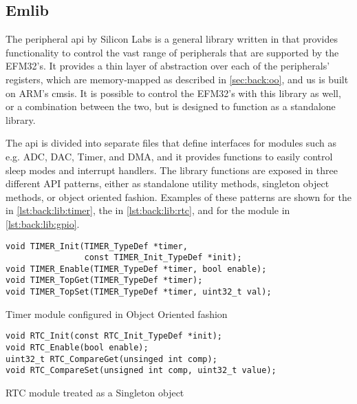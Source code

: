 \subsection{Emlib}
\label{sub:emlib}

The \emlib peripheral \gls{api} by Silicon Labs is a general library written in {\C} that provides functionality to control the vast range of peripherals that are supported by the EFM32's.
It provides a thin layer of abstraction over each of the peripherals' registers, which are memory-mapped as described in \autoref{sec:back:oo}, and us is built on ARM's \gls{cmsis}.
It is possible to control the EFM32's with this library as well, or a combination between the two, but {\emlib} is designed to function as a standalone library.

The \gls{api} is divided into separate files that define interfaces for modules such as e.g. ADC, DAC, Timer, and DMA, and it provides functions to easily control sleep modes and interrupt handlers.
The library functions are exposed in three different API patterns, either as standalone utility methods, singleton object methods, or {\C} object oriented fashion.
Examples of these patterns are shown for the  in \autoref{lst:back:lib:timer}, the  in \autoref{lst:back:lib:rtc}, and for the  module in \autoref{lst:back:lib:gpio}.

\begin{listing}[H]
  \begin{verbatim}
void TIMER_Init(TIMER_TypeDef *timer,
                const TIMER_Init_TypeDef *init);
void TIMER_Enable(TIMER_TypeDef *timer, bool enable);
void TIMER_TopGet(TIMER_TypeDef *timer);
void TIMER_TopSet(TIMER_TypeDef *timer, uint32_t val);
  \end{verbatim}
  \caption{Timer module configured in {\C} Object Oriented fashion}
  \label{lst:back:lib:timer}
\end{listing}

\begin{listing}[H]
  \begin{verbatim}
void RTC_Init(const RTC_Init_TypeDef *init);
void RTC_Enable(bool enable);
uint32_t RTC_CompareGet(unsinged int comp);
void RTC_CompareSet(unsigned int comp, uint32_t value);
  \end{verbatim}
  \caption{RTC module treated as a Singleton object}
  \label{lst:back:lib:rtc}
\end{listing}

